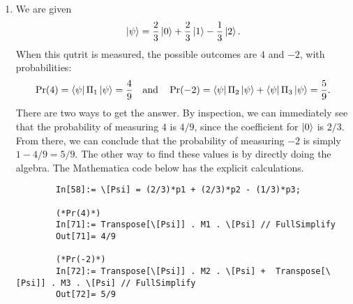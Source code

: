 \documentclass{article}
\theoremstyle{definition}
\newcommand{\f}[2]{\frac{#1}{#2}}
\begin{document}
\begin{enumerate}[label=(\alph*)]
	All the algebra is from above is verified in Matheatica. Mathematica calculations:
	\begin{lstlisting}
		(*eigv check*)
		In[53]:= M = {{2, 2, 2}, {2, -1, 1}, {2, 1, -1}};
		In[5]:= Eigenvalues[M]
		Out[5]= {4, -2, -2}
		
		(*vectors in the ONB*)
		p1 = {2, 1, 1}/Norm[{2, 1, 1}];
		p2 = {1, -1, -1}/Norm[{1, -1, -1}];
		p3 = {0, 1, -1}/Norm[{0, 1, -1}];
		
		(*check ONB*)
		In[14]:= Dot[p1, p2]
		Out[14]= 0
		In[15]:= Dot[p2, p3]
		Out[15]= 0
		In[16]:= Dot[p3, p1]
		Out[16]= 0
		In[21]:= Dot[p1, p1]
		Out[21]= 1
		In[22]:= Dot[p2, p2]
		Out[22]= 1
		In[23]:= Dot[p3, p3]
		Out[23]= 1
		
		(*Compute projectors*)
		In[46]:= M1 = KroneckerProduct[p1, p1]
		Out[46]= {{2/3, 1/3, 1/3}, {1/3, 1/6, 1/6}, {1/3, 1/6, 1/6}}
		In[47]:= M2 = KroneckerProduct[p2, p2]
		Out[47]= {{1/3, -(1/3), -(1/3)}, {-(1/3), 1/3, 1/3}, {-(1/3), 1/3, 1/3}}
		In[48]:= M3 = KroneckerProduct[p3, p3]
		Out[48]= {{0, 0, 0}, {0, 1/2, -(1/2)}, {0, -(1/2), 1/2}}
		
		(*Check resolution of identity:*)
		In[52]:= M1 + M2 + M3
		Out[52]= {{1, 0, 0}, {0, 1, 0}, {0, 0, 1}}
		In[205]:= M1 . M2
		Out[205]= {{0, 0, 0}, {0, 0, 0}, {0, 0, 0}}
		In[206]:= M2 . M3
		Out[206]= {{0, 0, 0}, {0, 0, 0}, {0, 0, 0}}
		In[207]:= M3 . M1
		Out[207]= {{0, 0, 0}, {0, 0, 0}, {0, 0, 0}}
	\end{lstlisting}
	
	
	\item We are given 
	\begin{align*}
		\ket{\psi} = \f{2}{3}\ket{0} + \f{2}{3}\ket{1} - \f{1}{3}\ket{2}.
	\end{align*}
	When this qutrit is measured, the possible outcomes are $4$ and $-2$, with probabilities:
	\begin{align*}
		\Pr(4) = \bra{\psi}\Pi_1 \ket{\psi} = \f{4}{9}\quad \text{and} \quad
		\Pr(-2) = \bra{\psi}\Pi_2 \ket{\psi} + \bra{\psi}\Pi_3 \ket{\psi} = \f{5}{9}.
	\end{align*}
	There are two ways to get the answer. By inspection, we can immediately see that the probability of measuring $4$ is $4/9$, since the coefficient for $\ket{0}$ is $2/3$. From there, we can conclude that the probability of measuring $-2$ is simply $1-4/9=5/9$. The other way to find these values is by directly doing the algebra. The Mathematica code below has the explicit calculations.
	
	\begin{lstlisting}
		In[58]:= \[Psi] = (2/3)*p1 + (2/3)*p2 - (1/3)*p3;
		
		(*Pr(4)*)
		In[71]:= Transpose[\[Psi]] . M1 . \[Psi] // FullSimplify
		Out[71]= 4/9
		
		(*Pr(-2)*)
		In[72]:= Transpose[\[Psi]] . M2 . \[Psi] +  Transpose[\[Psi]] . M3 . \[Psi] // FullSimplify
		Out[72]= 5/9
	\end{lstlisting} 	
\end{enumerate}
\end{document}
